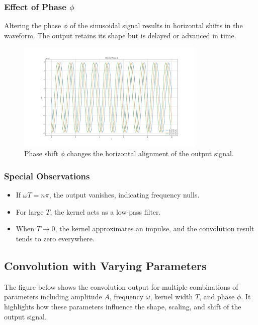 \subsubsection{Effect of Phase \( \phi \)}

Altering the phase \( \phi \) of the sinusoidal signal results in horizontal shifts in the waveform. The output retains its shape but is delayed or advanced in time.
\begin{figure}[h]
    \centering
    \includegraphics[width=0.8\textwidth]{codes/codes_sin_2/figs/phi.png}
    \caption{Phase shift \( \phi \) changes the horizontal alignment of the output signal.}
\end{figure}

\subsubsection{Special Observations}
\begin{itemize}
    \item If \( \omega T = n\pi \), the output vanishes, indicating frequency nulls.
    \item For large \( T \), the kernel acts as a low-pass filter.
    \item When \( T \rightarrow 0 \), the kernel approximates an impulse, and the convolution result tends to zero everywhere.
\end{itemize}

\subsection{Convolution with Varying Parameters}

The figure below shows the convolution output for multiple combinations of parameters including amplitude \( A \), frequency \( \omega \), kernel width \( T \), and phase \( \phi \). It highlights how these parameters influence the shape, scaling, and shift of the output signal.

